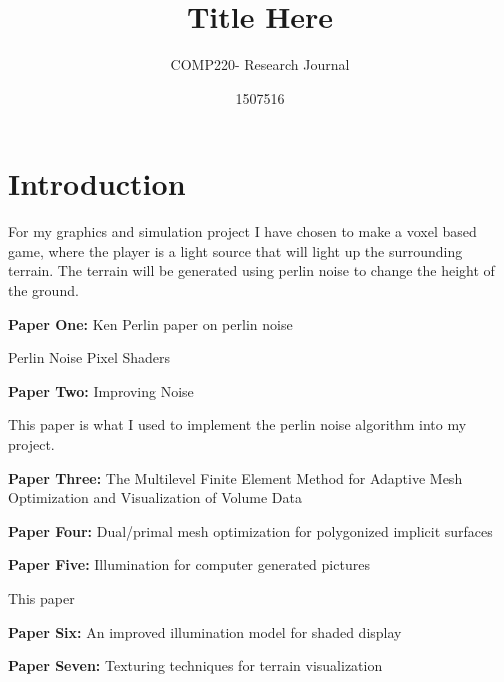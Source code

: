 \documentclass{scrartcl}
\title{Title Here}
\subtitle{COMP220- Research Journal}
\author{1507516}
\begin{document}
\maketitle

\abstract{}

\section{Introduction}
For my graphics and simulation project I have chosen to make a voxel based game, where the player is a light source that will light up the surrounding terrain. The terrain will be generated using perlin noise to change the height of the ground.



\textbf{Paper One:}
Ken Perlin paper on perlin noise

Perlin Noise Pixel Shaders
\cite{hart2001perlin}

\par

\textbf{Paper Two:}
Improving Noise
\cite{perlin2002improving}
\par

This paper is what I used to implement the perlin noise algorithm into my project.

\par 

\textbf{Paper Three:}
The Multilevel Finite Element Method for Adaptive Mesh
Optimization and Visualization of Volume Data
\cite{grosso1997multilevel}
\par

\textbf{Paper Four:}
Dual/primal mesh optimization for polygonized implicit surfaces
\cite{ohtake2002dual}
\par

\textbf{Paper Five:}
Illumination for computer generated pictures
\cite{phong1975illumination}
\par
This paper 

\textbf{Paper Six:}
An improved illumination model for shaded display
\cite{whitted2005improved}
\par

\textbf{Paper Seven:}
Texturing techniques for terrain visualization
\cite{dollner2000texturing}
\par





\end{document}
